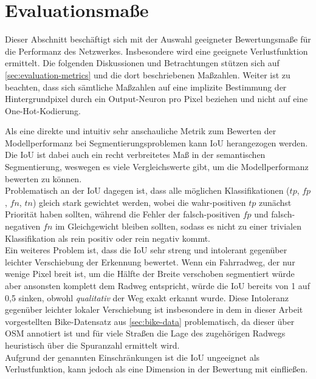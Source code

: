 \section{Evaluationsmaße}

Dieser Abschnitt beschäftigt sich mit der Auswahl geeigneter Bewertungsmaße für die Performanz des Netzwerkes. 
Insbesondere wird eine geeignete Verlustfunktion ermittelt. Die folgenden Diskussionen und 
Betrachtungen stützen sich auf \autoref{sec:evaluation-metrics} und die dort beschriebenen Maßzahlen.
Weiter ist zu beachten, dass sich sämtliche Maßzahlen auf eine implizite Bestimmung der Hintergrundpixel
durch ein Output-Neuron pro Pixel beziehen und nicht auf eine One-Hot-Kodierung. 

Als eine direkte und intuitiv sehr anschauliche Metrik zum Bewerten der Modellperformanz bei Segmentierungsproblemen
kann \ac{IoU} herangezogen werden. Die \ac{IoU} ist dabei auch ein recht verbreitetes Maß in der semantischen Segmentierung, 
weswegen es viele Vergleichswerte gibt, um die Modellperformanz bewerten zu können. \\ 
Problematisch an der \ac{IoU} dagegen ist, dass alle möglichen Klassifikationen ($tp$, $fp$, $fn$, $tn$)
gleich stark gewichtet werden, wobei die wahr-positiven $tp$ zunächst Priorität haben sollten, 
während die Fehler der falsch-positiven $fp$ und falsch-negativen $fn$ im Gleichgewicht bleiben sollten, 
sodass es nicht zu einer trivialen Klassifikation als rein positiv oder rein negativ kommt. \\
Ein weiteres Problem ist, dass die \ac{IoU} sehr streng und intolerant gegenüber leichter Verschiebung der Erkennung 
bewertet. Wenn ein Fahrradweg, der nur wenige Pixel breit ist, um die Hälfte der Breite verschoben segmentiert würde
aber ansonsten komplett dem Radweg entspricht, würde die \ac{IoU} bereits von 1 auf 0,5 sinken, obwohl \textit{qualitativ} 
der Weg exakt erkannt wurde. Diese Intoleranz gegenüber leichter lokaler Verschiebung ist insbesondere in dem 
in dieser Arbeit vorgestellten Bike-Datensatz aus \autoref{sec:bike-data} problematisch, 
da dieser über \ac{OSM} annotiert ist und für viele Straßen die Lage des zugehörigen Radwegs heuristisch über 
die Spuranzahl ermittelt wird. \\
Aufgrund der genannten Einschränkungen ist die \ac{IoU} ungeeignet als Verlustfunktion, kann jedoch als eine Dimension 
in der Bewertung mit einfließen. 


